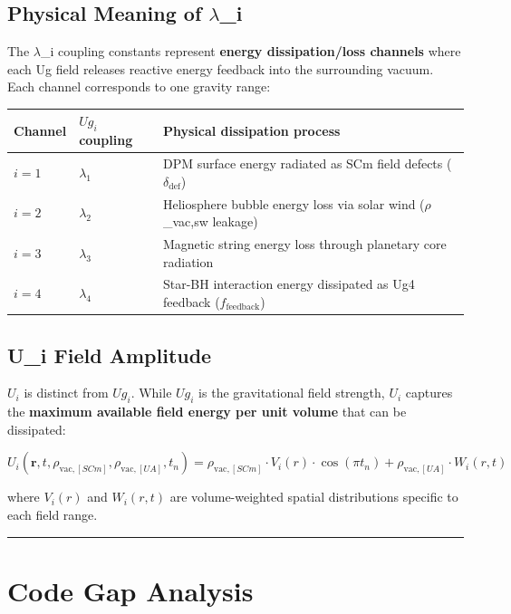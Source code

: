 \documentclass[12pt,a4paper]{article}
\begin{document}
\subsection{Physical Meaning of $\lambda$\_i}

The $\lambda$\_i coupling constants represent \textbf{energy dissipation/loss channels} where each Ug field releases reactive energy feedback into the surrounding vacuum. Each channel corresponds to one gravity range:

\begin{table}[H]
\centering
\small
\begin{tabularx}{\linewidth}{@{}>{\raggedright\arraybackslash}X>{\raggedright\arraybackslash}X>{\raggedright\arraybackslash}X@{}}
\toprule
Channel & $Ug_i$ coupling & Physical dissipation process \tabularnewline
\midrule
$i=1$ & $\lambda_1$ & DPM surface energy radiated as SCm field defects ($\delta_{\text{def}}$) \tabularnewline
$i=2$ & $\lambda_2$ & Heliosphere bubble energy loss via solar wind ($\rho$\_vac,sw leakage) \tabularnewline
$i=3$ & $\lambda_3$ & Magnetic string energy loss through planetary core radiation \tabularnewline
$i=4$ & $\lambda_4$ & Star-BH interaction energy dissipated as Ug4 feedback ($f_{\text{feedback}}$) \tabularnewline
\bottomrule
\end{tabularx}
\end{table}

\subsection{U\_i Field Amplitude}

$U_i$ is distinct from $Ug_i$. While $Ug_i$ is the gravitational field strength, $U_i$ captures the \textbf{maximum available field energy per unit volume} that can be dissipated:

\begin{equation}
U_i(\mathbf{r},t,\rho_{\text{vac},[SCm]},\rho_{\text{vac},[UA]},t_n) = \rho_{\text{vac},[SCm]} \cdot V_i(r) \cdot \cos(\pi t_n) + \rho_{\text{vac},[UA]} \cdot W_i(r,t)
\end{equation}

where $V_i(r)$ and $W_i(r,t)$ are volume-weighted spatial distributions specific to each field range.

\medskip\hrule\medskip

\section{Code Gap Analysis}
\end{document}
